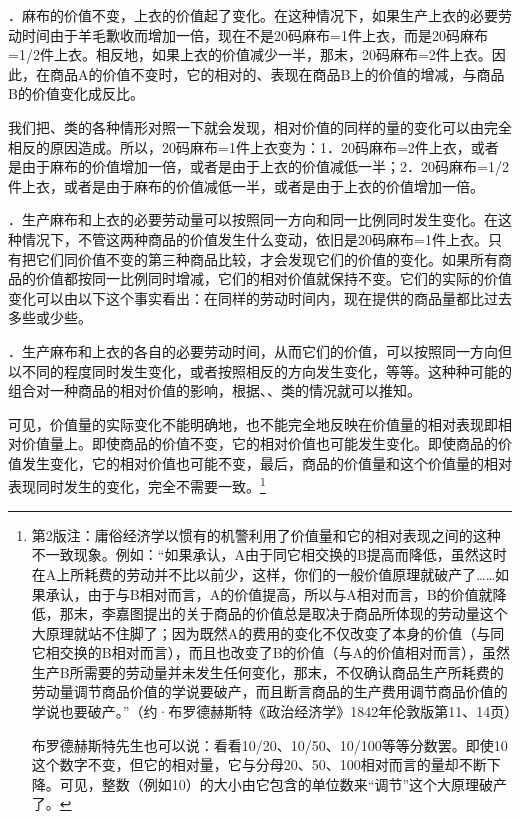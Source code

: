 \documentclass{ctexbook}
\begin{document}
                \uppercase\expandafter{}．麻布的价值不变，上衣的价值起了变化。在这种情况下，如果生产上衣的必要劳动时间由于羊毛歉收而增加一倍，现在不是20码麻布=1件上衣，而是20码麻布=1/2件上衣。相反地，如果上衣的价值减少一半，那末，20码麻布=2件上衣。因此，在商品A的价值不变时，它的相对的、表现在商品B上的价值的增减，与商品B的价值变化成反比。
                
                我们把\uppercase\expandafter{}、\uppercase\expandafter{}类的各种情形对照一下就会发现，相对价值的同样的量的变化可以由完全相反的原因造成。所以，20码麻布=1件上衣变为：1．20码麻布=2件上衣，或者是由于麻布的价值增加一倍，或者是由于上衣的价值减低一半；2．20码麻布=1/2件上衣，或者是由于麻布的价值减低一半，或者是由于上衣的价值增加一倍。
                
                \uppercase\expandafter{}．生产麻布和上衣的必要劳动量可以按照同一方向和同一比例同时发生变化。在这种情况下，不管这两种商品的价值发生什么变动，依旧是20码麻布=1件上衣。只有把它们同价值不变的第三种商品比较，才会发现它们的价值的变化。如果所有商品的价值都按同一比例同时增减，它们的相对价值就保持不变。它们的实际的价值变化可以由以下这个事实看出：在同样的劳动时间内，现在提供的商品量都比过去多些或少些。
                
                \uppercase\expandafter{}．生产麻布和上衣的各自的必要劳动时间，从而它们的价值，可以按照同一方向但以不同的程度同时发生变化，或者按照相反的方向发生变化，等等。这种种可能的组合对一种商品的相对价值的影响，根据\uppercase\expandafter{}、\uppercase\expandafter{}、\uppercase\expandafter{}类的情况就可以推知。
                
                可见，价值量的实际变化不能明确地，也不能完全地反映在价值量的相对表现即相对价值量上。即使商品的价值不变，它的相对价值也可能发生变化。即使商品的价值发生变化，它的相对价值也可能不变，最后，商品的价值量和这个价值量的相对表现同时发生的变化，完全不需要一致。\footnote{第2版注：庸俗经济学以惯有的机警利用了价值量和它的相对表现之间的这种不一致现象。例如：“如果承认，A由于同它相交换的B提高而降低，虽然这时在A上所耗费的劳动并不比以前少，这样，你们的一般价值原理就破产了……如果承认，由于与B相对而言，A的价值提高，所以与A相对而言，B的价值就降低，那末，李嘉图提出的关于商品的价值总是取决于商品所体现的劳动量这个大原理就站不住脚了；因为既然A的费用的变化不仅改变了本身的价值（与同它相交换的B相对而言），而且也改变了B的价值（与A的价值相对而言），虽然生产B所需要的劳动量并未发生任何变化，那末，不仅确认商品生产所耗费的劳动量调节商品价值的学说要破产，而且断言商品的生产费用调节商品价值的学说也要破产。”（约·布罗德赫斯特《政治经济学》1842年伦敦版第11、14页）
                
                布罗德赫斯特先生也可以说：看看10/20、10/50、10/100等等分数罢。即使10这个数字不变，但它的相对量，它与分母20、50、100相对而言的量却不断下降。可见，整数（例如10）的大小由它包含的单位数来“调节”这个大原理破产了。}
\end{document}
